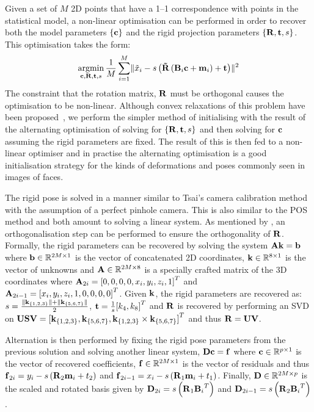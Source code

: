 Given a set of $M$ 2D points that have a 1--1 correspondence with points in the
statistical model, a non-linear optimisation can be performed in order to
recover both the model parameters $\{\boldsymbol{\mathbf{c}}\}$ and the rigid projection parameters
$\{\boldsymbol{\mathbf{R}}, \boldsymbol{\mathbf{t}}, s\}$. This optimisation takes the form:
\begin{equation}
\argmin_{\bb{c}, \bb{R}, \bb{t}, s} \frac{1}{M} \sum_{i=1}^M \lVert \tilde{x}_i - s \left( \bb{\tilde{R}} \left(\bb{B}_i \bb{c} + \bb{m}_i\right) + \bb{t} \right) \rVert^2
\end{equation}
The constraint that the rotation matrix, $\boldsymbol{\mathbf{R}}$ must be orthogonal causes
the optimisation to be non-linear. Although convex relaxations of this problem
have been proposed~\cite{zhou20153d}, we perform the simpler method of
initialising with the result of the alternating optimisation of solving for
$\{\boldsymbol{\mathbf{R}}, \boldsymbol{\mathbf{t}}, s\}$ and then solving for $\boldsymbol{\mathbf{c}}$ assuming the rigid parameters
are fixed. The result of this is then fed to a non-linear optimiser and in practise
the alternating optimisation is a good initialisation strategy for the kinds
of deformations and poses commonly seen in images of faces.

The rigid pose is solved in a manner similar to Tsai's camera
calibration method~\cite{tsai1987versatile} with the assumption of a perfect
pinhole camera. This is also similar to the POS~\cite{dementhon1995model}
method and both amount to solving a linear system. 
As mentioned by \citet{bas2016fitting}, an orthogonalisation step can be 
performed to ensure the orthogonality of $\boldsymbol{\mathbf{R}}$.
Formally, the rigid parameters can be recovered by solving the system
$\boldsymbol{\mathbf{A}}\boldsymbol{\mathbf{k}} = \boldsymbol{\mathbf{b}}$ where $\boldsymbol{\mathbf{b}} \in \mathbb{R}^{2M \times 1}$ is the vector
of concatenated 2D coordinates, $\boldsymbol{\mathbf{k}} \in \mathbb{R}^{8 \times 1}$ is the vector of
unknowns and $\boldsymbol{\mathbf{A}} \in \mathbb{R}^{2M \times 8}$ is a specially crafted matrix
of the 3D coordinates where $\boldsymbol{\mathbf{A}}_{2i} = {[0, 0, 0, 0, x_i, y_i, z_i, 1]}^T$ and
$\boldsymbol{\mathbf{A}}_{2i -1} = {[x_i, y_i, z_i, 1, 0, 0, 0, 0]}^T$. Given $\boldsymbol{\mathbf{k}}$, the rigid
parameters are recovered as:
$s = \frac{\lVert{} \boldsymbol{\mathbf{k}}_{\{1,2,3\}} \rVert + \lVert{} \boldsymbol{\mathbf{k}}_{\{5,6,7\}} \rVert}{2}$, $\boldsymbol{\mathbf{t}} = \frac{1}{s} {[k_4, k_8]}^T$
and $\boldsymbol{\mathbf{R}}$ is recovered by performing an SVD on
$\boldsymbol{\mathbf{U}}\boldsymbol{\mathbf{S}}\boldsymbol{\mathbf{V}} = {[\boldsymbol{\mathbf{k}}_{\{1,2,3\}}, \boldsymbol{\mathbf{k}}_{\{5,6,7\}}, \boldsymbol{\mathbf{k}}_{\{1,2,3\}} \times \boldsymbol{\mathbf{k}}_{\{5,6,7\}}]}^T$
and thus $\boldsymbol{\mathbf{R}} = \boldsymbol{\mathbf{U}}\boldsymbol{\mathbf{V}}$.

Alternation is then performed by fixing the rigid pose parameters from the previous
solution and solving another linear system, $\boldsymbol{\mathbf{D}}\boldsymbol{\mathbf{c}} = \boldsymbol{\mathbf{f}}$ where
$\boldsymbol{\mathbf{c}} \in \mathbb{R}^{p \times 1}$ is the vector of recovered coefficients,
$\boldsymbol{\mathbf{f}} \in \mathbb{R}^{2M \times 1}$ is the vector of residuals and thus
$\boldsymbol{\mathbf{f}}_{2i} = y_i - s \left(\boldsymbol{\mathbf{R}}_2 \boldsymbol{\mathbf{m}}_i + t_2 \right)$ and
$\boldsymbol{\mathbf{f}}_{2i - 1} = x_i - s \left(\boldsymbol{\mathbf{R}}_1 \boldsymbol{\mathbf{m}}_i + t_1 \right)$. Finally,
$\boldsymbol{\mathbf{D}} \in \mathbb{R}^{2M \times p}$ is the scaled and rotated basis given by
$\boldsymbol{\mathbf{D}}_{2i} = s \left( \boldsymbol{\mathbf{R}}_1 {\boldsymbol{\mathbf{B}}_i}^T \right)$ and 
$\boldsymbol{\mathbf{D}}_{2i - 1} = s \left( \boldsymbol{\mathbf{R}}_2 {\boldsymbol{\mathbf{B}}_i}^T \right)$.
